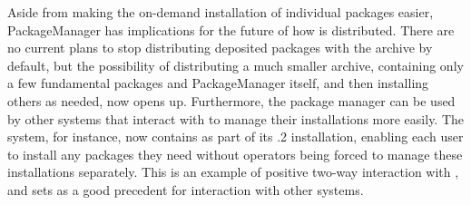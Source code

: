 Aside from making the on-demand installation of individual packages easier, {\sf
  PackageManager} has implications for the future of how \GAP is distributed.
There are no current plans to stop distributing
deposited packages with the \GAP archive by default, but the
possibility of distributing a much smaller archive, containing only a few
fundamental packages and {\sf
  PackageManager} itself, and then installing others as needed, now
opens up.  Furthermore, the package manager
can be used by other systems that interact with \GAP to manage
their \GAP installations more easily.  The \cocalc system, for instance, now contains 
as part of its .2 installation, enabling each user to install any
packages they need without \cocalc operators being forced to manage these
installations separately.  This is an example of positive two-way interaction
with \cocalc, and sets as a good precedent for interaction with other
systems.

